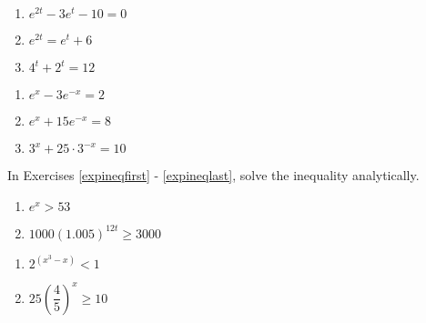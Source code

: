 \begin{multicols}{3}
\begin{enumerate}
\setcounter{enumi}{\value{HW}}

\item $e^{2t} - 3e^{t}-10=0$ %
\item $e^{2t} = e^{t}+6$ %
\item $4^{t} + 2^{t} = 12$ %


\setcounter{HW}{\value{enumi}}
\end{enumerate}
\end{multicols}

\begin{multicols}{3}
\begin{enumerate}
\setcounter{enumi}{\value{HW}}

\item $e^{x}-3e^{-x}=2$ %
\item $e^{x}+15e^{-x}=8$ %
\item $3^{x}+25\cdot3^{-x}=10$ %
\label{expeqnlast} 

\setcounter{HW}{\value{enumi}}
\end{enumerate}
\end{multicols}

In Exercises \ref{expineqfirst} - \ref{expineqlast}, solve the inequality analytically.

\begin{multicols}{2} 
\begin{enumerate}
\setcounter{enumi}{\value{HW}}

\item $e^{x} > 53$ \label{expineqfirst} 
\item $1000\left(1.005\right)^{12t} \geq 3000$ 

\setcounter{HW}{\value{enumi}}
\end{enumerate}
\end{multicols}

\begin{multicols}{2} 
\begin{enumerate}
\setcounter{enumi}{\value{HW}}

\item $2^{(x^{3} - x)} < 1$
\item $25\left(\dfrac{4}{5}\right)^{x} \geq 10$

\setcounter{HW}{\value{enumi}}
\end{enumerate}
\end{multicols}

